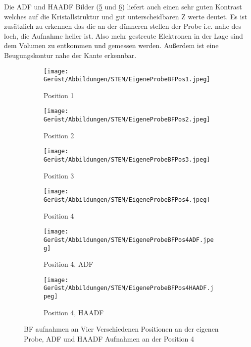 Die ADF und HAADF Bilder (\cref{Pos4ADF} und \cref{Pos4HAADF}) liefert auch einen sehr guten Kontrast welches auf die Kristallstruktur und gut unterscheidbaren Z werte deutet.  Es ist zusätzlich zu erkennen das die an der dünneren stellen der Probe i.e. nahe des loch, die Aufnahme heller ist. Also mehr gestreute Elektronen in der Lage sind dem Volumen zu entkommen und gemessen werden. Außerdem ist eine Beugungskontur nahe der Kante erkennbar.



\begin{figure}[H]
     \centering
     \begin{subfigure}[b]{0.4\textwidth}
         \centering
         \texttt{[image: Gerüst/Abbildungen/STEM/EigeneProbeBFPos1.jpeg]}
         \caption{Position 1}
         \label{Pos1}
     \end{subfigure}
     \hfill
     \begin{subfigure}[b]{0.4\textwidth}
         \centering
         \texttt{[image: Gerüst/Abbildungen/STEM/EigeneProbeBFPos2.jpeg]}
         \caption{Position 2}
         \label{Pos2}
     \end{subfigure}
      

 \centering
     \begin{subfigure}[b]{0.4\textwidth}
         \centering
         \texttt{[image: Gerüst/Abbildungen/STEM/EigeneProbeBFPos3.jpeg]}
         \caption{Position 3}
         \label{Pos3}
     \end{subfigure}
     \hfill
     \begin{subfigure}[b]{0.4\textwidth}
         \centering
         \texttt{[image: Gerüst/Abbildungen/STEM/EigeneProbeBFPos4.jpeg]}
         \caption{Position 4}
         \label{Pos4}
     \end{subfigure}
     
      \centering
     \begin{subfigure}[b]{0.4\textwidth}
         \centering
         \texttt{[image: Gerüst/Abbildungen/STEM/EigeneProbeBFPos4ADF.jpeg]}
         \caption{Position 4, ADF}
         \label{Pos4ADF}
     \end{subfigure}
     \hfill
     \begin{subfigure}[b]{0.4\textwidth}
         \centering
         \texttt{[image: Gerüst/Abbildungen/STEM/EigeneProbeBFPos4HAADF.jpeg]}
         \caption{Position 4, HAADF}
         \label{Pos4HAADF}
     \end{subfigure}
     
     \caption{BF aufnahmen an Vier Verschiedenen Positionen an der eigenen Probe, ADF und HAADF Aufnahmen an der Position 4}
        \label{EigeneProbeBFPositionen}
 
\end{figure}

